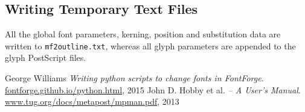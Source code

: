 \documentclass{scrartcl}
\begin{document}
\subsection{Writing Temporary Text Files}
%
All the global font parameters, kerning, position and substitution data are written to \texttt{mf2outline.txt}, whereas all glyph parameters are appended to the glyph PostScript files.
%
\begin{thebibliography}{Williams15}
	George Williams
	\emph{Writing python scripts to change fonts in FontForge}.
	\url{fontforge.github.io/python.html}, 2015
	John D. Hobby et al.
	\emph{\MP{} -- A User's Manual}.
	\url{www.tug.org/docs/metapost/mpman.pdf}, 2013
\end{thebibliography}
\end{document}
